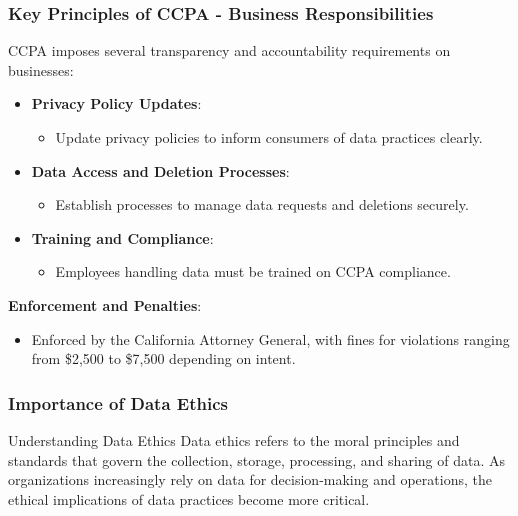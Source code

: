 \documentclass{beamer}
\begin{document}
\begin{frame}[fragile]
    \frametitle{Key Principles of CCPA - Business Responsibilities}
    CCPA imposes several transparency and accountability requirements on businesses:

    \begin{itemize}
        \item \textbf{Privacy Policy Updates}:
        \begin{itemize}
            \item Update privacy policies to inform consumers of data practices clearly.
        \end{itemize}
        
        \item \textbf{Data Access and Deletion Processes}:
        \begin{itemize}
            \item Establish processes to manage data requests and deletions securely.
        \end{itemize}
        
        \item \textbf{Training and Compliance}:
        \begin{itemize}
            \item Employees handling data must be trained on CCPA compliance.
        \end{itemize}
    \end{itemize}

    \textbf{Enforcement and Penalties}:
    \begin{itemize}
        \item Enforced by the California Attorney General, with fines for violations ranging from \$2,500 to \$7,500 depending on intent.
    \end{itemize}
\end{frame}

\begin{frame}[fragile]
    \frametitle{Importance of Data Ethics}
    \begin{block}{Understanding Data Ethics}
        Data ethics refers to the moral principles and standards that govern the collection, storage, processing, and sharing of data. 
        As organizations increasingly rely on data for decision-making and operations, the ethical implications of data practices become more critical.
    \end{block}
\end{frame}
\end{document}
